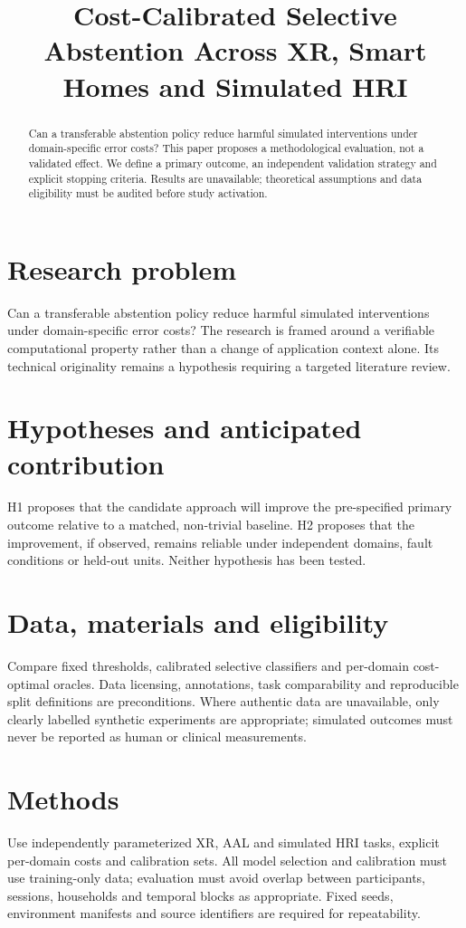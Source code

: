 \documentclass[11pt,a4paper]{article}
\title{Cost-Calibrated Selective Abstention Across XR, Smart Homes and Simulated HRI}
\author{}
\date{}
\begin{document}
\maketitle
\begin{abstract}
Can a transferable abstention policy reduce harmful simulated interventions under domain-specific error costs? This paper proposes a methodological evaluation, not a validated effect. We define a primary outcome, an independent validation strategy and explicit stopping criteria. Results are unavailable; theoretical assumptions and data eligibility must be audited before study activation.
\end{abstract}
\section{Research problem}
Can a transferable abstention policy reduce harmful simulated interventions under domain-specific error costs? The research is framed around a verifiable computational property rather than a change of application context alone. Its technical originality remains a hypothesis requiring a targeted literature review.
\section{Hypotheses and anticipated contribution}
H1 proposes that the candidate approach will improve the pre-specified primary outcome relative to a matched, non-trivial baseline. H2 proposes that the improvement, if observed, remains reliable under independent domains, fault conditions or held-out units. Neither hypothesis has been tested.
\section{Data, materials and eligibility}
Compare fixed thresholds, calibrated selective classifiers and per-domain cost-optimal oracles. Data licensing, annotations, task comparability and reproducible split definitions are preconditions. Where authentic data are unavailable, only clearly labelled synthetic experiments are appropriate; simulated outcomes must never be reported as human or clinical measurements.
\section{Methods}
Use independently parameterized XR, AAL and simulated HRI tasks, explicit per-domain costs and calibration sets. All model selection and calibration must use training-only data; evaluation must avoid overlap between participants, sessions, households and temporal blocks as appropriate. Fixed seeds, environment manifests and source identifiers are required for repeatability.
\end{document}
